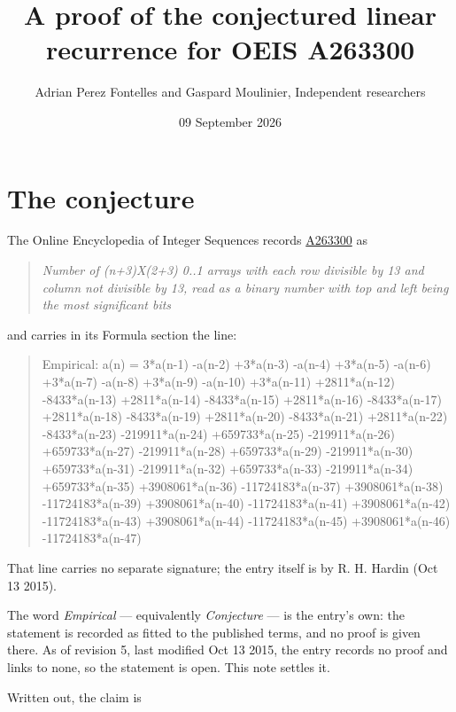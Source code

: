 \documentclass[11pt]{article}
\title{A proof of the conjectured linear recurrence for OEIS A263300}
\author{Adrian Perez Fontelles and Gaspard Moulinier, Independent researchers}
\date{09 September 2026}
\theoremstyle{definition}
\begin{document}
\maketitle
\section{The conjecture}

The Online Encyclopedia of Integer Sequences records \href{https://oeis.org/A263300}{A263300} as

\begin{quote}\itshape Number of (n+3)X(2+3) 0..1 arrays with each row divisible by 13 and column not divisible by 13, read as a binary number with top and left being the most significant bits\end{quote}

and carries in its Formula section the line:

\begin{quote}\ttfamily Empirical: a(n) = 3*a(n-1) -a(n-2) +3*a(n-3) -a(n-4) +3*a(n-5) -a(n-6) +3*a(n-7) -a(n-8) +3*a(n-9) -a(n-10) +3*a(n-11) +2811*a(n-12) -8433*a(n-13) +2811*a(n-14) -8433*a(n-15) +2811*a(n-16) -8433*a(n-17) +2811*a(n-18) -8433*a(n-19) +2811*a(n-20) -8433*a(n-21) +2811*a(n-22) -8433*a(n-23) -219911*a(n-24) +659733*a(n-25) -219911*a(n-26) +659733*a(n-27) -219911*a(n-28) +659733*a(n-29) -219911*a(n-30) +659733*a(n-31) -219911*a(n-32) +659733*a(n-33) -219911*a(n-34) +659733*a(n-35) +3908061*a(n-36) -11724183*a(n-37) +3908061*a(n-38) -11724183*a(n-39) +3908061*a(n-40) -11724183*a(n-41) +3908061*a(n-42) -11724183*a(n-43) +3908061*a(n-44) -11724183*a(n-45) +3908061*a(n-46) -11724183*a(n-47)\end{quote}

That line carries no separate signature; the entry itself is by R. H. Hardin (Oct 13 2015).

The word {\itshape Empirical} --- equivalently {\itshape Conjecture} --- is the entry's own: the statement is recorded as fitted to the published terms, and no proof is given there. As of revision 5, last modified Oct 13 2015, the entry records no proof and links to none, so the statement is open. This note settles it.

Written out, the claim is
\end{document}
